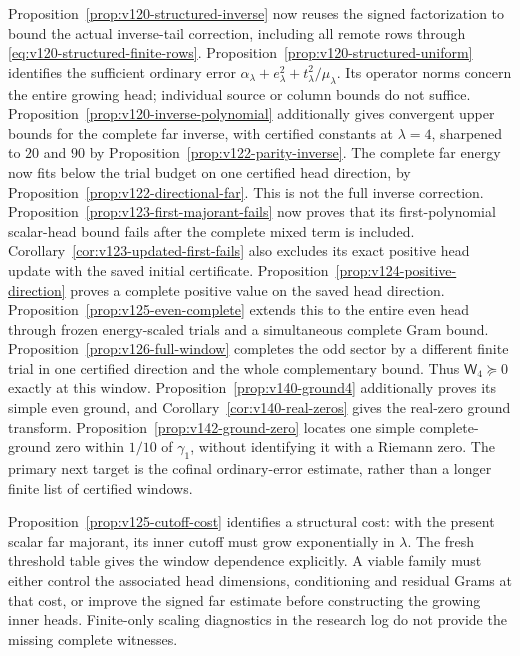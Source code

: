 \documentclass[11pt]{article}
\theoremstyle{remark}
\begin{document}
Proposition~\ref{prop:v120-structured-inverse} now reuses the signed
factorization to bound the actual inverse-tail correction, including
all remote rows through \eqref{eq:v120-structured-finite-rows}.
Proposition~\ref{prop:v120-structured-uniform} identifies the sufficient
ordinary error $\alpha_\lambda+e_\lambda^2+
 t_\lambda^2/\mu_\lambda$. Its operator norms concern the entire
growing head; individual source or column bounds do not suffice.
Proposition~\ref{prop:v120-inverse-polynomial} additionally gives
convergent upper bounds for the complete far inverse, with certified
constants at $\lambda=4$, sharpened to $20$ and $90$ by
Proposition~\ref{prop:v122-parity-inverse}. The complete far energy
now fits below the trial budget on one certified head direction,
by Proposition~\ref{prop:v122-directional-far}. This is not the full
inverse correction. Proposition~\ref{prop:v123-first-majorant-fails}
now proves that its first-polynomial scalar-head bound fails after
the complete mixed term is included. Corollary~\ref{cor:v123-updated-first-fails}
also excludes its exact positive head update with the saved initial
certificate. Proposition~\ref{prop:v124-positive-direction}
proves a complete positive value on the saved head direction.
Proposition~\ref{prop:v125-even-complete} extends this to the entire
even head through frozen energy-scaled trials and a simultaneous
complete Gram bound. Proposition~\ref{prop:v126-full-window}
completes the odd sector by a different finite trial in one
certified direction and the whole complementary bound. Thus
$\mathsf W_4\succeq0$ exactly at this window.
Proposition~\ref{prop:v140-ground4} additionally proves its simple
even ground, and Corollary~\ref{cor:v140-real-zeros} gives the
real-zero ground transform. Proposition~\ref{prop:v142-ground-zero}
locates one simple complete-ground zero within $1/10$ of $\gamma_1$,
without identifying it with a Riemann zero. The primary
next target is the cofinal ordinary-error estimate, rather than a
longer finite list of certified windows.

Proposition~\ref{prop:v125-cutoff-cost} identifies a structural cost:
with the present scalar far majorant, its inner cutoff must grow
exponentially in $\lambda$. The fresh threshold table gives the
window dependence explicitly. A viable family must either control
the associated head dimensions, conditioning and residual Grams at
that cost, or improve the signed far estimate before constructing
the growing inner heads. Finite-only scaling diagnostics in the
research log do not provide the missing complete witnesses.
\end{document}
